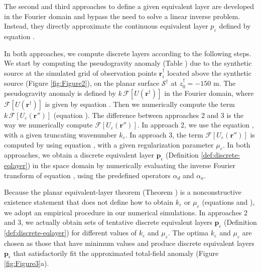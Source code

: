 The second and third approaches to define a given equivalent layer are developed in the Fourier domain 
and bypass the need to solve a linear inverse problem. Instead, they directly approximate the continuous 
equivalent layer $p_{\varepsilon}$ defined by equation . 

In both approaches, we compute discrete layers according to the following steps.
We start by computing the pseudogravity anomaly (Table ) due to the synthetic source 
at the simulated grid of observation points $\mathbf{r}^{\dagger}_{i}$ located above the synthetic source (Figure \ref{fig:Figure2}), 
on the planar surface $\mathcal{S}^{\dagger}$ at $z^{\dagger}_{0} = -150$ m.
The pseudogravity anomaly is defined by $k \, \mathcal{F}\left[ U(\mathbf{r}^{\dagger}) \right]$ in the Fourier domain,
where $\mathcal{F}\left[ U(\mathbf{r}^{\dagger}) \right]$ is given by equation .
Then we numerically compute the term $k \, \mathcal{F}\left[ U_{\varepsilon}(\mathbf{r}'') \right]$ (equation ).
The difference between approaches 2 and 3 is the way we numerically compute $\mathcal{F}\left[ U_{\varepsilon}(\mathbf{r}'') \right]$.
In approach 2, we use the equation 
, with a given truncating wavenumber $k_{\varepsilon}$. 
In approach 3, the term $\mathcal{F}\left[ U_{\varepsilon}(\mathbf{r}'') \right]$ is computed by using equation 
, with a given regularization parameter $\mu_{\varepsilon}$.
In both approaches, we obtain a discrete equivalent layer $\mathbf{p}_{\epsilon}$ (Definition \ref{def:discrete-eqlayer})
in the space domain by numerically evaluating the inverse Fourier transform of equation , 
using the predefined operators $\alpha_{d}$ and $\alpha_{a}$.

Because the planar equivalent-layer theorem (Theorem ) is a nonconstructive existence statement 
that does not define how to obtain $k_{\varepsilon}$ or $\mu_{\varepsilon}$ (equations  and 
), we adopt an empirical procedure in our numerical simulations.
In approaches 2 and 3, we actually obtain sets of tentative discrete equivalent layers $\mathbf{p}_{\epsilon}$ (Definition \ref{def:discrete-eqlayer}) 
for different values of $k_{\varepsilon}$ and $\mu_{\varepsilon}$. 
The optima $k_{\varepsilon}$ and $\mu_{\varepsilon}$ are chosen as those that have minimum values 
and produce discrete equivalent layers $\mathbf{p}_{\epsilon}$ that satisfactorily fit the approximated 
total-field anomaly (Figure \ref{fig:Figure3}a).

